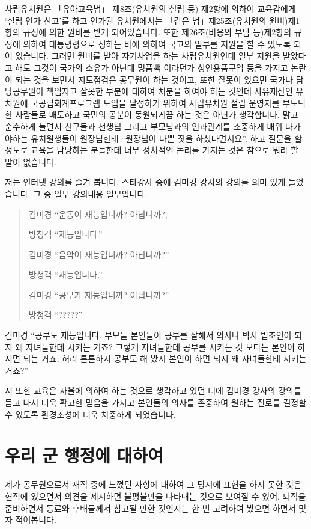 \documentclass[chapter,book,openany,twoside]{oblivoir}
\begin{document}
사립유치원은 「유아교육법」 제8조(유치원의 설립 등) 제2항에 의하여 교육감에게 `설립 인가 신고'를 하고 인가된 유치원에서는 「같은 법」제25조(유치원의 원비)제1항의 규정에 의한 원비를 받게 되어있습니다. 또한 제26조(비용의 부담 등)제2항의 규정에 의하여 대통령령으로 정하는 바에 의하여 국고의 일부를 지원을 할 수 있도록 되어 있습니다. 그러면 원비를 받아 자기사업을 하는 사립유치원인데 일부 지원을 받았다고 해도 그것이 국가의 소유가 아닌데 명품빽 이라던가 성인용품구입 등을 가지고 논란이 되는 것을 보면서 지도점검은 공무원이 하는 것이고, 또한 잘못이 있으면 국가나 담당공무원이 책임지고 잘못한 부분에 대하여 처분을 하여야 하는 것인데 사유재산인 유치원에 국공립회계프로그램 도입을 달성하기 위하여 사립유치원 설립 운영자를 부도덕한 사람들로 매도하고 국민의 공분이 동원되게끔 하는 것은 아닌가 생각합니다. 맑고 순수하게 놀면서 친구들과 선생님 그리고 부모님과의 인과관계를 소중하게 배워 나가야하는 유치원생들이 원장님한테 ``원장님이 나쁜 짓을 하셨다면서요''. 하고 질문을 할 정도로 교육을 담당하는 분들한테 너무 정치적인 논리를 가지는 것은 참으로 뭐라 할 말이 없습니다.

저는 인터넷 강의를 즐겨 봅니다. 스타강사 중에 김미경 강사의 강의를 의미 있게 들었습니다. 그 중 일부 강의내용 일부입니다.
\begin{quote}
김미경 ``운동이 재능입니까? 아닙니까?, 

방청객 ``재능입니다.''

김미경 ``음악이 재능입니까? 아닙니까?''

방청객 ``재능입니다.''

김미경 ``공부가 재능입니까? 아닙니까?''

방청객 ``?????''
\end{quote}
김미경 ``공부도 재능입니다. 부모들 본인들이 공부를 잘해서 의사나 박사 법조인이 되지 왜 자녀들한테 시키는 거죠? 그렇게 자녀들한테 공부를 시키는 것 보다는 본인이 하시면 되는 거죠, 허리 튼튼하지 공부도 해 봤지 본인이 하면 되지 왜 자녀들한테 시키는 거죠?''

저 또한 교육은 자율에 의하여 하는 것으로 생각하고 있던 터에 김미경 강사의 강의를 듣고 나서 더욱 확고한 믿음을 가지고 본인들의 의사를 존중하여 원하는 진로를 결정할 수 있도록 환경조성에 더욱 치중하게 되었습니다.

\section{우리 군 행정에 대하여}

제가 공무원으로서 재직 중에 느꼈던 사항에 대하여 그 당시에 표현을 하지 못한 것은 현직에 있으면서 의견을 제시하면 불평불만을 나타내는 것으로 보여질 수 있어, 퇴직을 준비하면서 동료와 후배들께서 참고될 만한 것인지는 한 번 고려하여 봤으면 하면서 몇 자 적어봅니다. 
\end{document}
